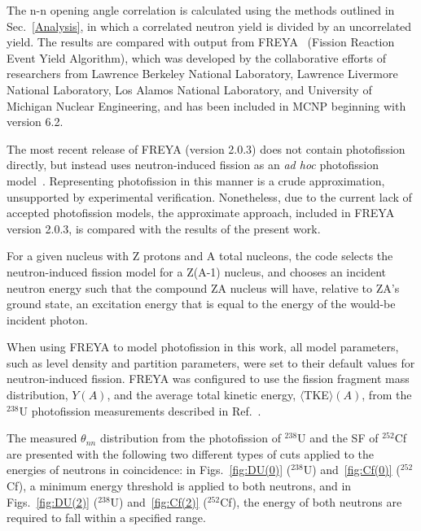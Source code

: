 The n-n opening angle correlation is calculated using the methods outlined in Sec.~\ref{Analysis}, in which a correlated neutron yield is divided by an uncorrelated yield.
The results are compared with output from FREYA~\cite{FREYA} (Fission Reaction Event Yield Algorithm), which was developed by the collaborative efforts of researchers from Lawrence Berkeley National Laboratory,  Lawrence Livermore National Laboratory, Los Alamos National Laboratory, and University of Michigan Nuclear Engineering, and has been included in MCNP beginning with version 6.2.
 
The most recent release of FREYA (version 2.0.3) does not contain photofission directly, but instead uses neutron-induced fission as an {\em{ad hoc}} photofission model~\cite{FREYA_photofission}.
Representing photofission in this manner is a crude approximation, unsupported by experimental verification.
Nonetheless, due to the current lack of accepted photofission models, the approximate approach, included in FREYA version 2.0.3, is compared with the results of the present work.

For a given nucleus with Z protons and A total nucleons, the code selects the neutron-induced fission model for a Z(A-1) nucleus, and chooses an incident neutron energy such that the compound ZA nucleus will have, relative to ZA's ground state, an excitation energy that is equal to the energy of the would-be incident photon.

When using FREYA to model photofission in this work, all model parameters, such as level density and partition parameters, were set to their default values for neutron-induced fission.
FREYA was configured to use the fission fragment mass distribution, $Y(A)$, and the average total kinetic energy, $\langle$TKE$\rangle(A)$, from the $^{238}$U photofission measurements described in Ref.~\cite{2017Krishichayan}.


The measured $\theta_{nn}$ distribution from the photofission of $^{238}$U and the SF of $^{252}$Cf are presented with the following two different types of cuts applied to the energies of neutrons in coincidence:
in Figs.~\ref{fig:DU(0)} ($^{238}$U) and~\ref{fig:Cf(0)} ($^{252}$Cf), a minimum energy threshold is applied to both neutrons, and in Figs.~\ref{fig:DU(2)} ($^{238}$U) and~\ref{fig:Cf(2)} ($^{252}$Cf), the energy of both neutrons are required to fall within a specified range.

